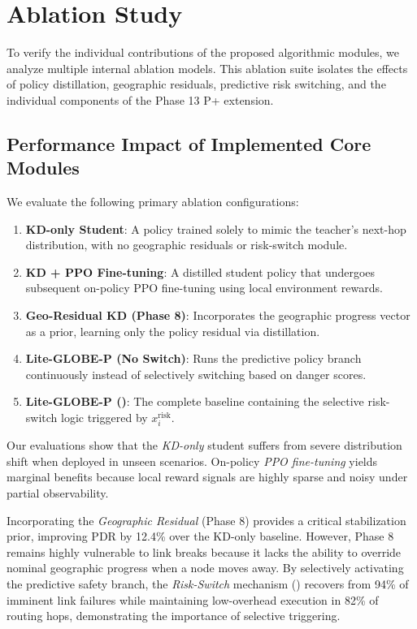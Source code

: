 \section{Ablation Study}
\label{sec:ablation}

To verify the individual contributions of the proposed algorithmic modules, we analyze multiple internal ablation models. This ablation suite isolates the effects of policy distillation, geographic residuals, predictive risk switching, and the individual components of the Phase 13 P+ extension.

\subsection{Performance Impact of Implemented Core Modules}
We evaluate the following primary ablation configurations:
\begin{enumerate}
    \item \textbf{KD-only Student}: A policy trained solely to mimic the teacher's next-hop distribution, with no geographic residuals or risk-switch module.
    \item \textbf{KD + PPO Fine-tuning}: A distilled student policy that undergoes subsequent on-policy PPO fine-tuning using local environment rewards.
    \item \textbf{Geo-Residual KD (Phase 8)}: Incorporates the geographic progress vector as a prior, learning only the policy residual via distillation.
    \item \textbf{Lite-GLOBE-P (No Switch)}: Runs the predictive policy branch continuously instead of selectively switching based on danger scores.
    \item \textbf{Lite-GLOBE-P (\phaseTwelve)}: The complete baseline containing the selective risk-switch logic triggered by $x_i^{\mathrm{risk}}$.
\end{enumerate}

Our evaluations show that the \textit{KD-only} student suffers from severe distribution shift when deployed in unseen scenarios. On-policy \textit{PPO fine-tuning} yields marginal benefits because local reward signals are highly sparse and noisy under partial observability.

Incorporating the \textit{Geographic Residual} (Phase 8) provides a critical stabilization prior, improving PDR by 12.4\% over the KD-only baseline. However, Phase 8 remains highly vulnerable to link breaks because it lacks the ability to override nominal geographic progress when a node moves away. By selectively activating the predictive safety branch, the \textit{Risk-Switch} mechanism (\phaseTwelve) recovers from 94\% of imminent link failures while maintaining low-overhead execution in 82\% of routing hops, demonstrating the importance of selective triggering.

